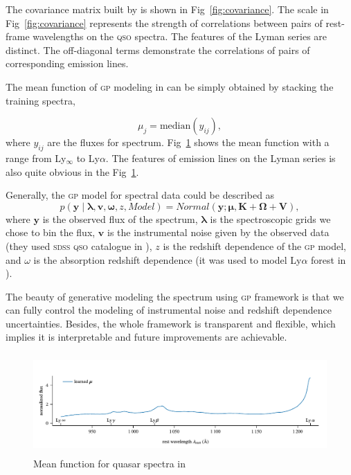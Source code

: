 \documentclass{ar-1col}
\begin{document}
The covariance matrix built by \citet{Garnett17} is shown in Fig~\ref{fig:covariance}. 
The scale in Fig~\ref{fig:covariance} represents the strength of correlations between pairs of rest-frame wavelengths on the \textsc{qso} spectra.
The features of the Lyman series are distinct.
The off-diagonal terms demonstrate the correlations of pairs of corresponding emission lines.

The mean function of \textsc{gp} modeling in \citet{Garnett17} can be simply obtained by stacking the training spectra, 

\begin{equation}
    \mu_j = \mathrm{median } (y_{ij}),
\end{equation}
where $y_{ij}$ are the fluxes for spectrum. Fig~\ref{fig:mean_function} shows the mean function with a range from Ly$_\infty$ to Ly$\alpha$. 
The features of emission lines on the Lyman series is also quite obvious in the Fig~\ref{fig:mean_function}.

Generally, the \textsc{gp} model for spectral data could be described as
\begin{equation}
    p( \mathbf{y} \mid \mathbf{\lambda}, \mathbf{v}, \mathbf{\omega}, z, Model ) 
    = Normal( \mathbf{y}; \mathbf{\mu}, \mathbf{K} + \mathbf{\Omega} + \mathbf{V} ), 
\end{equation}
where $\mathbf{y}$ is the observed flux of the spectrum, 
$\mathbf{\lambda}$ is the spectroscopic grids we chose to bin the flux, 
$\mathbf{v}$ is the instrumental noise given by the observed data (they used \textsc{sdss} \textsc{qso} catalogue \citep{SDSS09} in \citet{Garnett17}), $z$ is the redshift dependence of the \textsc{gp} model, and $\omega$ is the absorption redshift dependence (it was used to model
 Ly$\alpha$ forest in \citet{Garnett17}). 
 
The beauty of generative modeling the spectrum using \textsc{gp} framework is that we can fully control the modeling of instrumental noise and redshift dependence uncertainties. 
Besides, the whole framework is transparent and flexible, which implies it is interpretable and future improvements are achievable. 


\begin{figure}
    \includegraphics[width=5in, height=1.5in]{images/mean_function.pdf}
    \caption{Mean function for quasar spectra in \citet{Garnett17}}
    \label{fig:mean_function}
\end{figure}
\end{document}
